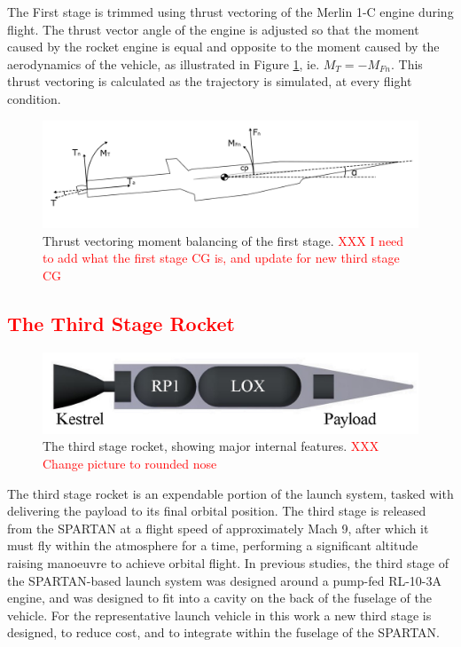   The First stage is trimmed using thrust vectoring of the Merlin 1-C engine during flight. The thrust vector angle of the engine is adjusted so that the moment caused by the rocket engine is equal and opposite to the moment caused by the aerodynamics of the vehicle, as illustrated in Figure \ref{fig:FirstStageThrustVec}, ie. $M_T = -M_{Fn}$.
  This thrust vectoring is calculated as the trajectory is simulated, at every flight condition. 
 

\begin{figure}
\centering
\includegraphics[width=0.9\linewidth]{figures/3_vehicle_design/FirstStageThrustVec}
\caption{Thrust vectoring moment balancing of the first stage. \textcolor{red}{XXX I need to add what the first stage CG is, and update for new third stage CG}}
\label{fig:FirstStageThrustVec}
\end{figure}
  
  
  



	

	\textcolor{red}{\section{The Third Stage Rocket}\label{sec:ThirdStageBaseline}}

	\begin{figure}
\centering
\includegraphics[width=0.7\linewidth]{figures/3_vehicle_design/3rdStage}
\caption{The third stage rocket, showing major internal features. \textcolor{red}{XXX Change picture to rounded nose}}
\label{fig:3rdStage}
\end{figure}

The third stage rocket is an expendable portion of the launch system, tasked with delivering the payload to its final orbital position. 
  The third stage is released from the SPARTAN at a flight speed of approximately Mach 9, after which it must fly within the atmosphere for a time, performing a significant altitude raising manoeuvre to achieve orbital flight\cite{Preller2017b}. 
  In previous studies, the third stage of the SPARTAN-based launch system was designed around a pump-fed RL-10-3A engine\cite{Preller2017b}, and was designed to fit into a cavity on the back of the fuselage of the vehicle\cite{Preller2017b}. For the representative launch vehicle in this work a new third stage is designed, to reduce cost, and to integrate within the fuselage of the SPARTAN. 
   
